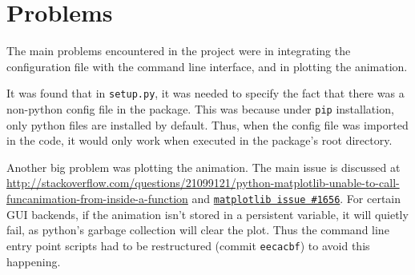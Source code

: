 \documentclass{article}
\begin{document}
\section*{Problems}
The main problems encountered in the project were in integrating the configuration file with the command line interface, and in plotting the animation.
\par
It was found that in \texttt{setup.py}, it was needed to specify the fact that there was a non-python config file in the package. This was because under \texttt{pip} installation, only python files are installed by default. Thus, when the config file was imported in the code, it would only work when executed in the package's root directory.
\par
Another big problem was plotting the animation. The main issue is discussed at \url{http://stackoverflow.com/questions/21099121/python-matplotlib-unable-to-call-funcanimation-from-inside-a-function} and \href{https://github.com/matplotlib/matplotlib/issues/1656}{\texttt{matplotlib issue \#1656}}. For certain GUI backends, if the animation isn't stored in a persistent variable, it will quietly fail, as python's garbage collection will clear the plot. Thus the command line entry point scripts had to be restructured (commit \texttt{eecacbf}) to avoid this happening.
\end{document}
